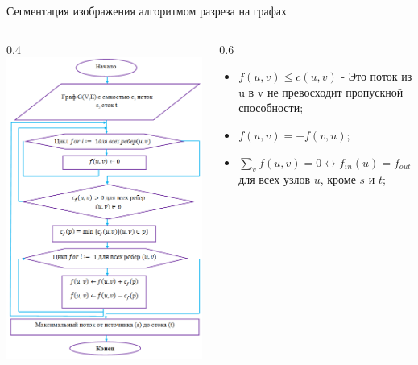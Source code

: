 \documentclass[10pt,pdf,hyperref={unicode},xcolor=table]{beamer}
\begin{document}
\begin{frame}{Сегментация изображения алгоритмом разреза на графах}		
\begin{columns}
		\begin{column} {0.4\textwidth}			
			\includegraphics[width=1\linewidth]{p5}
			\end{column}
			\begin{column} {0.6\textwidth}
			\begin{block}{}
			\begin{itemize}
	\item $f\left(u,v\right) \leq c\left(u,v\right)$ - Это поток из u в v не превосходит пропускной способности;
	\item $f\left(u,v\right) =-f\left(v,u\right)$;
	\item $\sum_vf\left(u,v\right)=0 \leftrightarrow f_{in}\left(u\right) =f_{out}\left(v\right)$ для всех узлов $u$, кроме $s$ и $t$;


\end{itemize}
\end{block}
\end{column}
\end{columns}
\end{frame}
\end{document}
